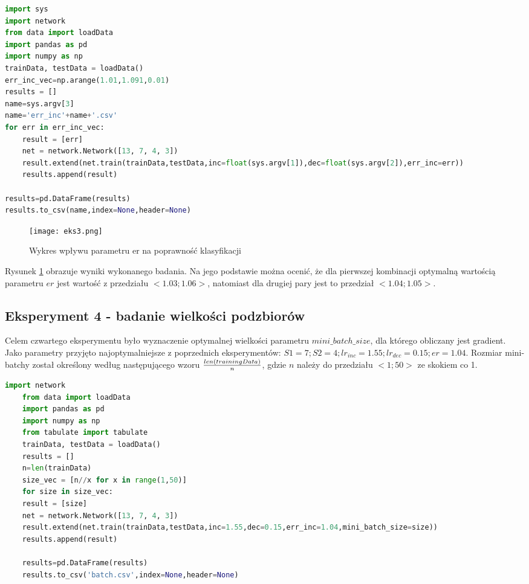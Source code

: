 \documentclass[12pt,twoside]{article}
\begin{document}
\begin{lstlisting}[language=Python,caption=Algorytm realizujący eksperyment 3,label={eks3}]
import sys
import network
from data import loadData
import pandas as pd
import numpy as np
trainData, testData = loadData()
err_inc_vec=np.arange(1.01,1.091,0.01)
results = []
name=sys.argv[3]
name='err_inc'+name+'.csv'
for err in err_inc_vec:
	result = [err]
	net = network.Network([13, 7, 4, 3])
	result.extend(net.train(trainData,testData,inc=float(sys.argv[1]),dec=float(sys.argv[2]),err_inc=err))
	results.append(result)

results=pd.DataFrame(results)
results.to_csv(name,index=None,header=None)

\end{lstlisting}

\begin{figure}[H]
\centering
\texttt{[image: eks3.png]}
\caption{Wykres wpływu parametru er na poprawność klasyfikacji}
\label{ryseks3}
\end{figure}

Rysunek \ref{ryseks3} obrazuje wyniki wykonanego badania.
Na jego podstawie można ocenić, że dla pierwszej kombinacji optymalną wartością parametru $er$ jest wartość z przedziału $<1.03;1.06>$, natomiast dla drugiej pary jest to przedział $<1.04;1.05>$.

\subsection{Eksperyment 4 - badanie wielkości podzbiorów}
Celem czwartego eksperymentu było wyznaczenie optymalnej wielkości parametru $mini\_batch\_size$, dla którego obliczany jest gradient. Jako parametry przyjęto najoptymalniejsze z poprzednich eksperymentów: $S1 = 7; S2=4; lr_{inc}=1.55; lr_{dec}=0.15; er=1.04$. Rozmiar mini-batchy został określony według następującego wzoru $len(trainingData)\over{n}$, gdzie $n$ należy do przedziału $<1; 50>$ ze skokiem co 1.
\begin{lstlisting}[language=Python,caption=Algorytm realizujący eksperyment 3,label={eks4}]
	import network
	from data import loadData
	import pandas as pd
	import numpy as np
	from tabulate import tabulate
	trainData, testData = loadData()
	results = []
	n=len(trainData)
	size_vec = [n//x for x in range(1,50)]
	for size in size_vec:
	result = [size]
	net = network.Network([13, 7, 4, 3])
	result.extend(net.train(trainData,testData,inc=1.55,dec=0.15,err_inc=1.04,mini_batch_size=size))
	results.append(result)
	
	results=pd.DataFrame(results)
	results.to_csv('batch.csv',index=None,header=None)
	
	
\end{lstlisting}
\end{document}
